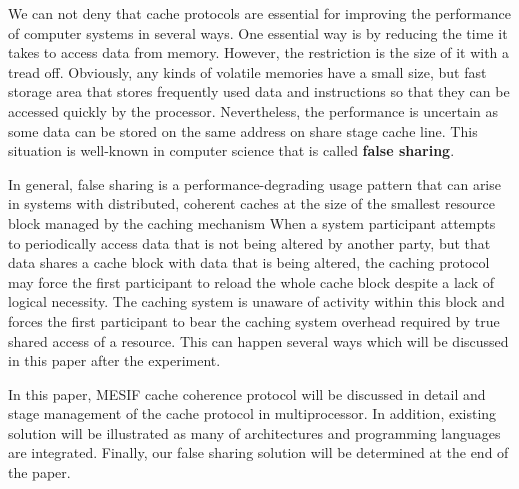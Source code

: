 \par We can not deny that cache protocols are essential for improving the performance of computer systems in several ways. One essential way is by reducing 
the time it takes to access data from memory. However, the restriction is the size of it with a tread off.
Obviously, any kinds of volatile memories have a small size, but fast storage area that stores frequently used data and instructions so that they can be 
accessed quickly by the processor. Nevertheless, the performance is uncertain as some data can be stored on the same address on share stage cache line.
This situation is well-known in computer science that is called \textbf{false sharing}.

\par In general, false sharing is a performance-degrading usage pattern  that can arise in systems with distributed, coherent caches at the size of the smallest 
resource block managed by the caching mechanism When a system participant attempts to periodically access data that is not being altered by another party, but that 
data shares a cache block with data that is being altered, the caching protocol may force the first participant to reload the whole cache block despite a lack of logical necessity.
The caching system is unaware of activity within this block and forces the first participant to bear the caching system overhead required by true shared access of a resource.
This can happen several ways which will be discussed in this paper after the experiment.

In this paper, MESIF cache coherence protocol will be discussed in detail and stage management of the cache protocol in multiprocessor.
In addition, existing solution will be illustrated as many of architectures and programming languages are integrated. Finally, our false sharing 
solution will be determined at the end of the paper.